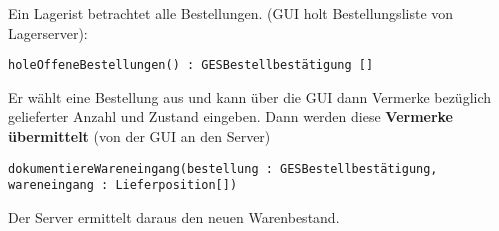 Ein Lagerist betrachtet alle Bestellungen. (GUI holt Bestellungsliste von Lagerserver):

\texttt{holeOffeneBestellungen() : GESBestellbestätigung []}

Er wählt eine Bestellung aus und kann über die GUI dann Vermerke bezüglich gelieferter Anzahl und Zustand eingeben. Dann werden diese \textbf{Vermerke übermittelt} (von der GUI an den Server)

\texttt{dokumentiereWareneingang(bestellung : GESBestellbestätigung, wareneingang : Lieferposition[])}

Der Server ermittelt daraus den neuen Warenbestand.